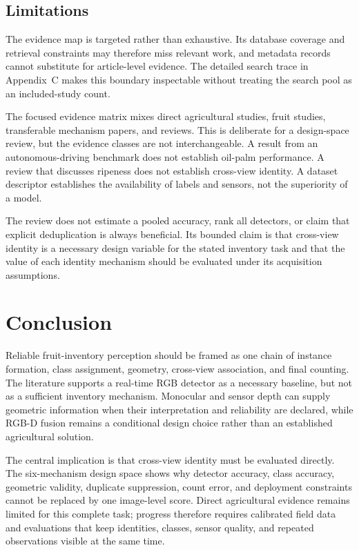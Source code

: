 \subsection{Limitations}
\label{sec:limitations}

The evidence map is targeted rather than exhaustive. Its database coverage and retrieval constraints may therefore miss relevant work, and metadata records cannot substitute for article-level evidence. The detailed search trace in Appendix~C makes this boundary inspectable without treating the search pool as an included-study count.

The focused evidence matrix mixes direct agricultural studies, fruit studies, transferable mechanism papers, and reviews. This is deliberate for a design-space review, but the evidence classes are not interchangeable. A result from an autonomous-driving benchmark does not establish oil-palm performance. A review that discusses ripeness does not establish cross-view identity. A dataset descriptor establishes the availability of labels and sensors, not the superiority of a model.

The review does not estimate a pooled accuracy, rank all detectors, or claim that explicit deduplication is always beneficial. Its bounded claim is that cross-view identity is a necessary design variable for the stated inventory task and that the value of each identity mechanism should be evaluated under its acquisition assumptions.



\section{Conclusion}

Reliable fruit-inventory perception should be framed as one chain of instance formation, class assignment, geometry, cross-view association, and final counting. The literature supports a real-time RGB detector as a necessary baseline, but not as a sufficient inventory mechanism. Monocular and sensor depth can supply geometric information when their interpretation and reliability are declared, while RGB-D fusion remains a conditional design choice rather than an established agricultural solution.

The central implication is that cross-view identity must be evaluated directly. The six-mechanism design space shows why detector accuracy, class accuracy, geometric validity, duplicate suppression, count error, and deployment constraints cannot be replaced by one image-level score. Direct agricultural evidence remains limited for this complete task; progress therefore requires calibrated field data and evaluations that keep identities, classes, sensor quality, and repeated observations visible at the same time.

